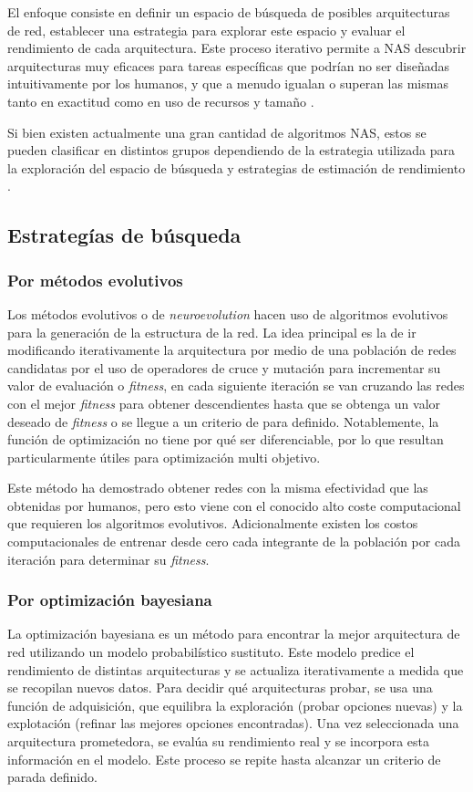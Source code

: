 El enfoque consiste en definir un espacio de búsqueda de posibles arquitecturas de red, establecer una estrategia para explorar este espacio y evaluar el rendimiento de cada arquitectura. Este proceso iterativo permite a NAS descubrir arquitecturas muy eficaces para tareas específicas que podrían no ser diseñadas intuitivamente por los humanos, y que a menudo igualan o superan las mismas tanto en exactitud como en uso de recursos y tamaño \cite{poyser_neural_2024}.

Si bien existen actualmente una gran cantidad de algoritmos NAS, estos se pueden clasificar en distintos grupos dependiendo de la estrategia utilizada para la exploración del espacio de búsqueda y estrategias de estimación de rendimiento \cite{elsken_neural_2018, baymurzina_review_2022, white_neural_2023}.

\subsection{Estrategías de búsqueda}
\subsubsection{Por métodos evolutivos}
Los métodos evolutivos o de \textit{neuroevolution} hacen uso de algoritmos evolutivos para la generación de la estructura de la red. La idea principal es la de ir modificando iterativamente la arquitectura por medio de una población de redes candidatas por el uso de operadores de cruce y mutación para incrementar su valor de evaluación o \textit{fitness}, en cada siguiente iteración se van cruzando las redes con el mejor \textit{fitness} para obtener descendientes hasta que se obtenga un valor deseado de \textit{fitness} o se llegue a un criterio de para definido. Notablemente, la función de optimización no tiene por qué ser diferenciable, por lo que resultan particularmente útiles para optimización multi objetivo. 

Este método ha demostrado obtener redes con la misma efectividad que las obtenidas por humanos, pero esto viene con el conocido alto coste computacional que requieren los algoritmos evolutivos. Adicionalmente existen los costos computacionales de entrenar desde cero cada integrante de la población por cada iteración para determinar su \textit{fitness}.

\subsubsection{Por optimización bayesiana}
La optimización bayesiana es un método para encontrar la mejor arquitectura de red utilizando un modelo probabilístico sustituto. Este modelo predice el rendimiento de distintas arquitecturas y se actualiza iterativamente a medida que se recopilan nuevos datos. Para decidir qué arquitecturas probar, se usa una función de adquisición, que equilibra la exploración (probar opciones nuevas) y la explotación (refinar las mejores opciones encontradas). Una vez seleccionada una arquitectura prometedora, se evalúa su rendimiento real y se incorpora esta información en el modelo. Este proceso se repite hasta alcanzar un criterio de parada definido.

